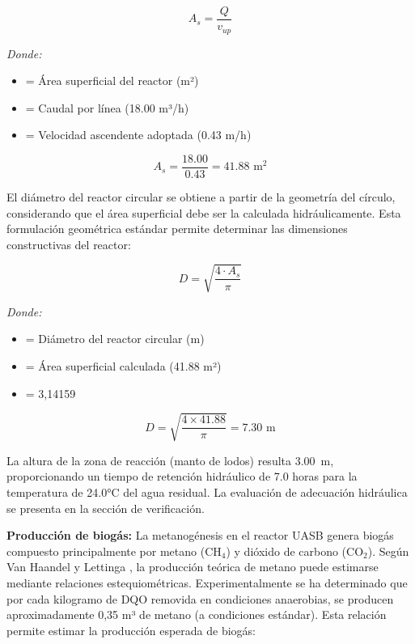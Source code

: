 \begin{equation}
A_s = \frac{Q}{v_{up}}
\end{equation}

\textit{Donde:}
\begin{itemize}[noitemsep,leftmargin=2em]
    \item[$A_s$] = Área superficial del reactor (m²)
    \item[$Q$] = Caudal por línea (18.00 m³/h)
    \item[$v_{up}$] = Velocidad ascendente adoptada (0.43 m/h)
\end{itemize}

\begin{equation}
A_s = \frac{18.00}{0.43} = 41.88 \text{ m}^2
\end{equation}

El diámetro del reactor circular se obtiene a partir de la geometría del círculo, considerando que el área superficial debe ser la calculada hidráulicamente. Esta formulación geométrica estándar permite determinar las dimensiones constructivas del reactor:

\begin{equation}
D = \sqrt{\frac{4 \cdot A_s}{\pi}}
\end{equation}

\textit{Donde:}
\begin{itemize}[noitemsep,leftmargin=2em]
    \item[$D$] = Diámetro del reactor circular (m)
    \item[$A_s$] = Área superficial calculada (41.88 m²)
    \item[$\pi$] = 3,14159
\end{itemize}

\begin{equation}
D = \sqrt{\frac{4 \times 41.88}{\pi}} = 7.30 \text{ m}
\end{equation}

La altura de la zona de reacción (manto de lodos) resulta 3.00~m, proporcionando un tiempo de retención hidráulico de 7.0 horas para la temperatura de 24.0°C del agua residual. La evaluación de adecuación hidráulica se presenta en la sección de verificación.

\textbf{Producción de biogás:} La metanogénesis en el reactor UASB genera biogás compuesto principalmente por metano (CH$_4$) y dióxido de carbono (CO$_2$). Según Van Haandel y Lettinga \cite{vanhaandel1994}, la producción teórica de metano puede estimarse mediante relaciones estequiométricas. Experimentalmente se ha determinado que por cada kilogramo de DQO removida en condiciones anaerobias, se producen aproximadamente 0,35 m³ de metano (a condiciones estándar). Esta relación permite estimar la producción esperada de biogás:

